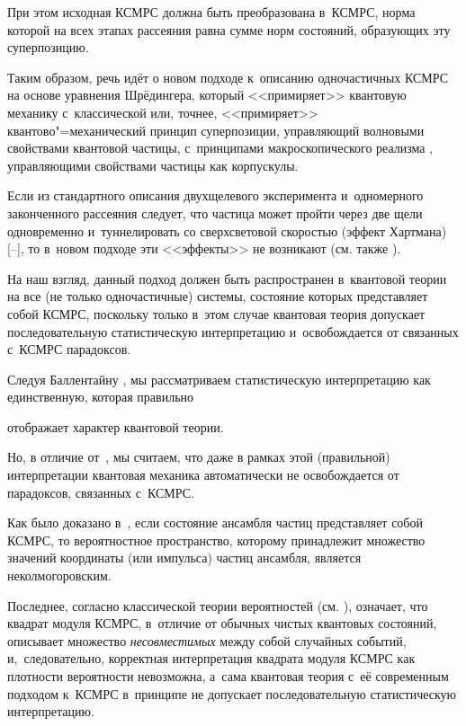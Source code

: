 При этом исходная КСМРС должна быть преобразована в~КСМРС, норма которой на всех этапах рассеяния равна сумме норм состояний, образующих эту суперпозицию.



Таким образом, речь идёт о новом подходе к~описанию одночастичных КСМРС на основе уравнения Шрёдингера, который <<примиряет>> квантовую механику с~классической или, точнее, <<примиряет>> квантово"=механический принцип суперпозиции, управляющий волновыми свойствами квантовой частицы, с~принципами макроскопического реализма \cite{chup:Leg}, управляющими свойствами частицы как корпускулы. 

Если из стандартного описания двухщелевого эксперимента и~одномерного законченного рассеяния следует, что частица может пройти через две щели одновременно и~туннелировать со сверхсветовой скоростью (эффект Хартмана) [--], то в~новом подходе эти <<эффекты>> не возникают (см. также \cite{chup:Ch3}).



На наш взгляд, данный подход должен быть распространен в~квантовой теории на все (не только одночастичные) системы, состояние которых представляет собой КСМРС, поскольку только в~этом случае квантовая теория допускает последовательную статистическую интерпретацию и~освобождается от связанных с~КСМРС парадоксов.



Следуя Баллентайну \cite{chup:Bal}, мы рассматриваем статистическую интерпретацию как единственную, которая правильно

отображает характер квантовой теории. 

Но, в отличие от~\cite{chup:Bal}, мы считаем, что даже в рамках этой (правильной) интерпретации квантовая механика автоматически не освобождается от парадоксов, связанных с~КСМРС. 

Как было доказано в~\cite{chup:Ac1}, если состояние ансамбля частиц представляет собой КСМРС, то вероятностное пространство, которому принадлежит множество значений координаты (или импульса) частиц ансамбля, является неколмогоровским.

Последнее, согласно классической теории вероятностей (см. \cite{chup:Hr1}), означает, что квадрат модуля КСМРС, в~отличие от обычных чистых квантовых состояний, описывает множество {\it несовместимых} между собой случайных событий, и,~следовательно, корректная интерпретация квадрата модуля КСМРС как плотности вероятности невозможна, а~сама квантовая теория с~её современным подходом к~КСМРС в~принципе не допускает последовательную статистическую интерпретацию. 

